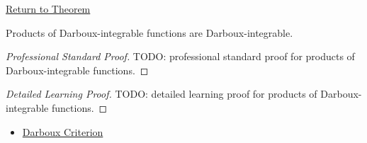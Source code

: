 \newpage
{}
\label{prf:darboux-integrable-products}

\begin{remark*}[Return]
\hyperref[thm:darboux-integrable-products]{Return to Theorem}
\end{remark*}

\begin{theorem*}
Products of Darboux-integrable functions are Darboux-integrable.
\end{theorem*}

\begin{proof}[Professional Standard Proof]
\LRAProofBodyStart
TODO: professional standard proof for products of Darboux-integrable functions.
\end{proof}

\begin{proof}[Detailed Learning Proof]
\LRAProofBodyStart
TODO: detailed learning proof for products of Darboux-integrable functions.
\end{proof}

\begin{remark*}
\end{remark*}

\begin{dependencies}
\begin{itemize}
  \item \hyperref[thm:darboux-criterion]{Darboux Criterion}
\end{itemize}
\end{dependencies}

\clearpage

